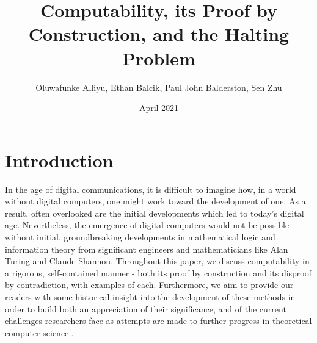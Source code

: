 \documentclass{article}
\title{Computability, its Proof by Construction, and the Halting Problem}
\author{Oluwafunke Alliyu, Ethan Balcik, Paul John Balderston, Sen Zhu}
\date{April 2021}
\begin{document}
\theoremstyle{definition}
\newtheorem{exmp}{Example}[section]
\newtheorem{defin}{Definition}[section]
\newtheorem{prf}{Proof}[section]

\maketitle

\section{Introduction}
In the age of digital communications, it is difficult to imagine how, in a world without digital computers, one might work toward the development of one.  As a result, often overlooked are the initial developments which led to today's digital age.  Nevertheless, the emergence of digital computers would not be possible without initial, groundbreaking developments in mathematical logic and information theory from significant engineers and mathematicians like Alan Turing and Claude Shannon.  Throughout this paper, we discuss computability in a rigorous, self-contained manner - both its proof by construction and its disproof by contradiction, with examples of each.  Furthermore, we aim to provide our readers with some historical insight into the development of these methods in order to build both an appreciation of their significance, and of the current challenges researchers face as attempts are made to further progress in theoretical computer science \cite{1}.
\end{document}
